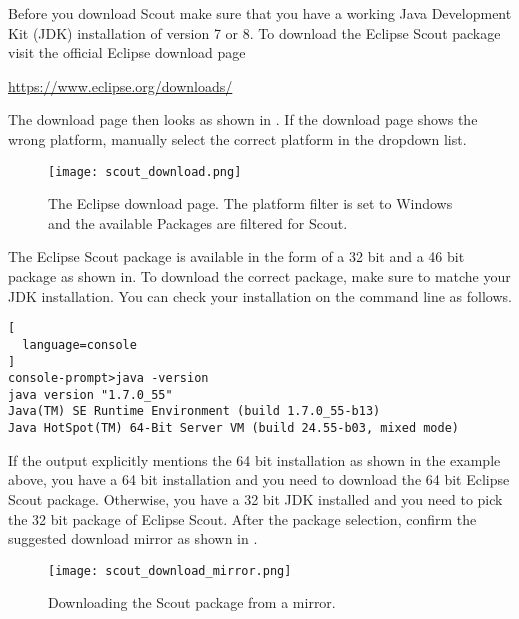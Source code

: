 %

Before you download Scout make sure that you have a working Java Development Kit (JDK) installation of version 7 or 8.
To download the Eclipse Scout package visit the official Eclipse download page

\url{https://www.eclipse.org/downloads/}

The download page then looks as shown in .
If the download page shows the wrong platform, manually select the correct platform in the dropdown list.

\begin{figure}
\texttt{[image: scout\_download.png]}
\caption{The Eclipse download page. The platform filter is set to Windows and the available Packages are filtered for Scout.}
\end{figure}

The Eclipse Scout package is available in the form of a 32 bit and a 46 bit package as shown in. 
To download the correct package, make sure to matche your JDK installation. 
You can check your installation on the command line as follows.

\begin{lstlisting}[
  language=console
]
console-prompt>java -version
java version "1.7.0_55"
Java(TM) SE Runtime Environment (build 1.7.0_55-b13)
Java HotSpot(TM) 64-Bit Server VM (build 24.55-b03, mixed mode)
\end{lstlisting}

If the output explicitly mentions the 64 bit installation as shown in the example above, you have a 64 bit installation and you need to download the 64 bit Eclipse Scout package. 
Otherwise, you have a 32 bit JDK installed and you need to pick the 32 bit package of Eclipse Scout.
After the package selection, confirm the suggested download mirror as shown in .

\begin{figure}
\texttt{[image: scout\_download\_mirror.png]}
\caption{Downloading the Scout package from a mirror.}
\end{figure}

